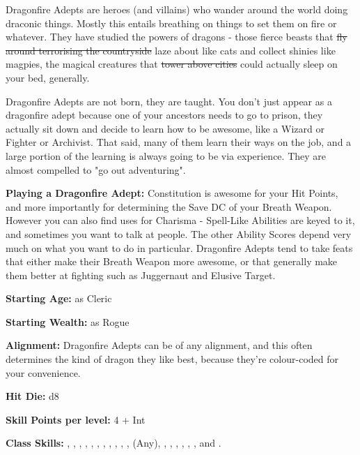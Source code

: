 
Dragonfire Adepts are heroes (and villains) who wander around the world doing draconic things. Mostly this entails breathing on things to set them on fire or whatever. They have studied the powers of dragons - those fierce beasts that \sout{fly around terrorising the countryside} laze about like cats and collect shinies like magpies, the magical creatures that \sout{tower above cities} could actually sleep on your bed, generally.

Dragonfire Adepts are not born, they are taught. You don't just appear as a dragonfire adept because one of your ancestors needs to go to prison, they actually sit down and decide to learn how to be awesome, like a Wizard or Fighter or Archivist. That said, many of them learn their ways on the job, and a large portion of the learning is always going to be via experience. They are almost compelled to "go out adventuring".

\textbf{Playing a Dragonfire Adept:} Constitution is awesome for your Hit Points, and more importantly for determining the Save DC of your Breath Weapon. However you can also find uses for Charisma - Spell-Like Abilities are keyed to it, and sometimes you want to talk at people. The other Ability Scores depend very much on what you want to do in particular. Dragonfire Adepts tend to take feats that either make their Breath Weapon more awesome, or that generally make them better at fighting such as Juggernaut and Elusive Target.

\textbf{Starting Age:} as Cleric

\textbf{Starting Wealth:} as Rogue

\textbf{Alignment:} Dragonfire Adepts can be of any alignment, and this often determines the kind of dragon they like best, because they're colour-coded for your convenience.

\textbf{Hit Die:} d8

\textbf{Skill Points per level:} 4 + Int

\textbf{Class Skills:} , , , , , , , , , , ,  (Any), , , , , , , and .

